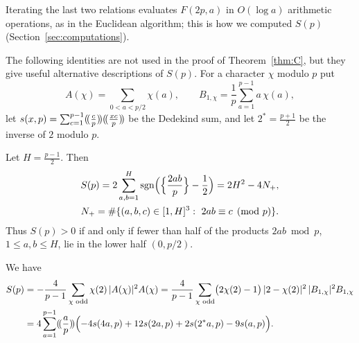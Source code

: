 Iterating the last two relations evaluates $F(2p,a)$ in $O(\log a)$ arithmetic operations, as in the Euclidean algorithm; this is how we computed $S(p)$ (Section~\ref{sec:computations}).

The following identities are not used in the proof of Theorem~\ref{thm:C}, but they give useful alternative descriptions of $S(p)$. For a character $\chi$ modulo $p$ put
\[
A(\chi)=\sum_{0<a<p/2}\chi(a),\qquad B_{1,\chi}=\frac1p\sum_{a=1}^{p-1}a\,\chi(a),
\]
let $s(x,p)=\sum_{c=1}^{p-1}(\!(\frac cp)\!)(\!(\frac{xc}p)\!)$ be the Dedekind sum, and let $2^*=\frac{p+1}2$ be the inverse of $2$ modulo $p$.

\begin{lemma}\label{lem:gauss}
Let $H=\frac{p-1}2$. Then
\begin{gather*}
S(p)=2\sum_{a,b=1}^H\operatorname{sgn}\Bigl(\Bigl\{\frac{2ab}p\Bigr\}-\frac12\Bigr)=2H^2-4N_+,\\
N_+=\#\{(a,b,c)\in[1,H]^3:\ 2ab\equiv c\pmod p\}.
\end{gather*}
Thus $S(p)>0$ if and only if fewer than half of the products $2ab\bmod p$, $1\le a,b\le H$, lie in the lower half $(0,p/2)$.
\end{lemma}

\begin{lemma}\label{lem:cubic}
We have
\begin{align*}
S(p)&=-\frac4{p-1}\sum_{\chi\text{ odd}}\chi(2)\,|A(\chi)|^2A(\chi)=\frac4{p-1}\sum_{\chi\text{ odd}}\bigl(2\chi(2)-1\bigr)\,|2-\chi(2)|^2\,|B_{1,\chi}|^2B_{1,\chi}\\
&=4\sum_{a=1}^{p-1}(\!(\frac ap)\!)\Bigl(-4s(4a,p)+12s(2a,p)+2s(2^*a,p)-9s(a,p)\Bigr).
\end{align*}
\end{lemma}

